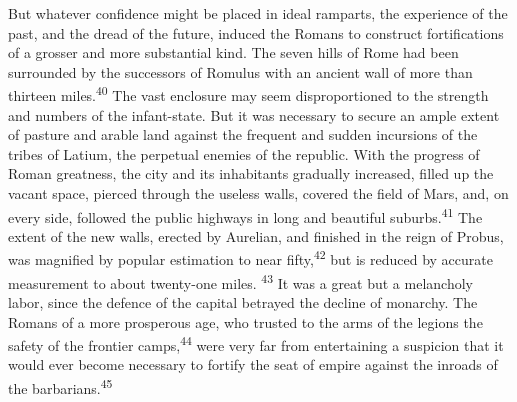 But whatever confidence might be placed in ideal ramparts, the
experience of the past, and the dread of the future, induced the
Romans to construct fortifications of a grosser and more
substantial kind. The seven hills of Rome had been surrounded by
the successors of Romulus with an ancient wall of more than
thirteen miles.\textsuperscript{40} The vast enclosure may seem disproportioned to
the strength and numbers of the infant-state. But it was
necessary to secure an ample extent of pasture and arable land
against the frequent and sudden incursions of the tribes of
Latium, the perpetual enemies of the republic. With the progress
of Roman greatness, the city and its inhabitants gradually
increased, filled up the vacant space, pierced through the
useless walls, covered the field of Mars, and, on every side,
followed the public highways in long and beautiful suburbs.\textsuperscript{41}
The extent of the new walls, erected by Aurelian, and finished in
the reign of Probus, was magnified by popular estimation to near
fifty,\textsuperscript{42} but is reduced by accurate measurement to about
twenty-one miles. \textsuperscript{43} It was a great but a melancholy labor, since
the defence of the capital betrayed the decline of monarchy. The
Romans of a more prosperous age, who trusted to the arms of the
legions the safety of the frontier camps,\textsuperscript{44} were very far from
entertaining a suspicion that it would ever become necessary to
fortify the seat of empire against the inroads of the barbarians.\textsuperscript{45}





